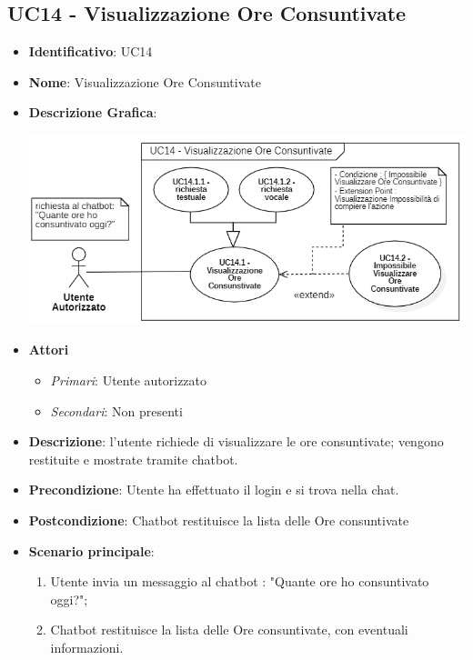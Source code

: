 \subsection{UC14 - Visualizzazione Ore Consuntivate }
\begin{itemize}
	\item \textbf{Identificativo}: UC14
	\item \textbf{Nome}: Visualizzazione Ore Consuntivate
	\item\textbf{Descrizione Grafica}: 
	\begin{center}
		\includegraphics[scale=0.65]{images/UC14.png} 
	\end{center}

	\item \textbf{Attori}
	\begin{itemize} 
		\item \textit{Primari}: Utente autorizzato
		\item \textit{Secondari}: Non presenti
	\end{itemize}
	\item \textbf{Descrizione}: l'utente richiede di visualizzare le ore consuntivate; vengono restituite e mostrate tramite chatbot.
	\item \textbf{Precondizione}: Utente ha effettuato il login e si trova nella chat.
	\item \textbf{Postcondizione}: Chatbot restituisce la lista delle Ore consuntivate
	\item \textbf{Scenario principale}:  
		\begin{enumerate}
			\item Utente invia un messaggio al chatbot : "Quante ore ho consuntivato oggi?";
			\item Chatbot restituisce la lista delle Ore consuntivate, con eventuali informazioni.
		\end{enumerate}
\end{itemize}